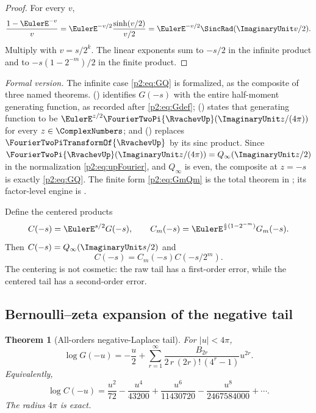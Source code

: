 \documentclass[11pt,oneside]{article}
\numberwithin{equation}{section}
\newtheorem{theorem}{Theorem}[section]
\theoremstyle{definition}
\theoremstyle{remark}
\begin{document}
\begin{proof}
For every $v$,
\[
 \frac{1-\EulerE^{-v}}{v}=\EulerE^{-v/2}\frac{\sinh(v/2)}{v/2}
 =\EulerE^{-v/2}\SincRad(\ImaginaryUnit v/2).
\]
Multiply with $v=s/2^k$.  The linear exponents sum to $-s/2$ in the infinite product and to
$-s(1-2^{-m})/2$ in the finite product.
\end{proof}

\emph{Formal version.}  The infinite case \eqref{p2:eq:GQ} is formalized, as the composite of
three named theorems.  
() identifies $G(-s)$ with the entire half-moment
generating function, as recorded after \eqref{p2:eq:Gdef};
 ()
states that generating function to be $\EulerE^{z/2}\FourierTwoPi{\RvachevUp}(\ImaginaryUnit z/(4\pi))$ for every
$z\in\ComplexNumbers$; and  () replaces
$\FourierTwoPiTransformOf{\RvachevUp}$ by its sinc product.  Since $\FourierTwoPi{\RvachevUp}(\ImaginaryUnit z/(4\pi))=Q_\infty(\ImaginaryUnit z/2)$ in the
normalization \eqref{p2:eq:upFourier}, and $Q_\infty$ is even, the composite at $z=-s$ is exactly
\eqref{p2:eq:GQ}.  The finite form \eqref{p2:eq:GmQm} is the total theorem
in ; its factor-level engine is
.

Define the centered products
\begin{equation}
 C(-s)=\EulerE^{s/2}G(-s),\qquad
 C_m(-s)=\EulerE^{\frac{s}{2}(1-2^{-m})}G_m(-s).
 \label{p2:eq:centered-G}
\end{equation}
Then $C(-s)=Q_\infty(\ImaginaryUnit s/2)$ and
\begin{equation}
 C(-s)=C_m(-s)C(-s/2^m).
 \label{p2:eq:centered-tail}
\end{equation}
The centering is not cosmetic: the raw tail has a first-order error, while the centered tail
has a second-order error.

\subsection{Bernoulli--zeta expansion of the negative tail}

\begin{theorem}[All-orders negative-Laplace tail]
\label{p2:thm:G-all-orders}
For $|u|<4\pi$,
\begin{equation}
 \boxed{
 \log G(-u)
 =-\frac{u}{2}
 +\sum_{r=1}^{\infty}
 \frac{B_{2r}}{2\,r\,(2r)!\,(4^r-1)}u^{2r}.}
 \label{p2:eq:G-all-orders}
\end{equation}
Equivalently,
\begin{equation}
 \log C(-u)
 =\frac{u^2}{72}-\frac{u^4}{43200}
  +\frac{u^6}{11430720}-\frac{u^8}{2467584000}+\cdots.
 \label{p2:eq:C-first}
\end{equation}
The radius $4\pi$ is exact.
\newresult
\end{theorem}
\end{document}
